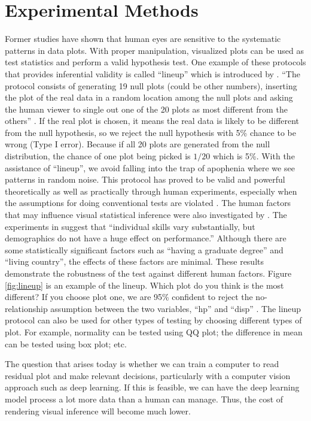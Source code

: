 \documentclass[12pt]{article}
\begin{document}
\section{Experimental Methods}
\label{sec:experiment}

Former studies have shown that human eyes are sensitive to the
systematic patterns in data plots. With proper manipulation, visualized
plots can be used as test statistics and perform a valid hypothesis
test. One example of these protocols that provides inferential validity
is called ``lineup'' which is introduced by \citet{HW10}. ``The protocol
consists of generating 19 null plots (could be other numbers), inserting
the plot of the real data in a random location among the null plots and
asking the human viewer to single out one of the 20 plots as most
different from the others'' \citep{HW10}. If the real plot is chosen, it
means the real data is likely to be different from the null hypothesis,
so we reject the null hypothesis with 5\% chance to be wrong (Type I
error). Because if all 20 plots are generated from the null
distribution, the chance of one plot being picked is \(1/20\) which is
5\%. With the assistance of ``lineup'', we avoid falling into the trap
of apophenia where we see patterns in random noise. This protocol has
proved to be valid and powerful theoretically as well as practically
through human experiments, especially when the assumptions for doing
conventional tests are violated \citep{MM13}. The human factors that may
influence visual statistical inference were also investigated by
\citet{human2014}. The experiments in \citet{human2014} suggest that
``individual skills vary substantially, but demographics do not have a
huge effect on performance.'' Although there are some statistically
significant factors such as ``having a graduate degree'' and ``living
country'', the effects of these factors are minimal. These results
demonstrate the robustness of the test against different human factors.
Figure \ref{fig:lineup} is an example of the lineup. Which plot do you
think is the most different? If you choose plot one, we are 95\%
confident to reject the no-relationship assumption between the two
variables, ``hp'' and ``disp'' \citep{SIM18}. The lineup protocol can
also be used for other types of testing by choosing different types of
plot. For example, normality can be tested using QQ plot; the difference
in mean can be tested using box plot; etc.

The question that arises today is whether we can train a computer to
read residual plot and make relevant decisions, particularly with a
computer vision approach such as deep learning. If this is feasible, we
can have the deep learning model process a lot more data than a human
can manage. Thus, the cost of rendering visual inference will become
much lower.
\end{document}
